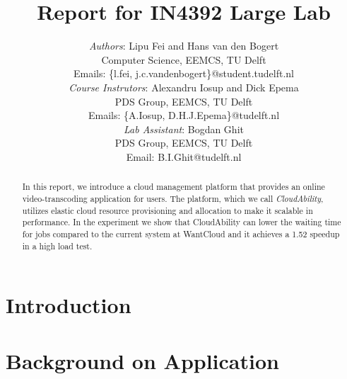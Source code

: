 \documentclass[10pt, a4paper, twoside, twocolumn, technote]{IEEEtran}
\begin{document}
\newcommand{\staterunning}
  {\textsc{running}}
\newcommand{\statepending}
  {\textsc{pending}}
  
\newcommand{\statefinished}
  {\textsc{finished}}
\newcommand{\statefailed}
  {\textsc{failed}}
  
\newcommand{\policystatic}
  {\textsc{static}}
\newcommand{\policysimpleelastic}
  {\textsc{simple elastic}}


\title{Report for IN4392 Large Lab}
\author{\textit{Authors}: Lipu Fei and Hans van den Bogert\\
  Computer Science, EEMCS, TU Delft\\
  Emails: \{l.fei, j.c.vandenbogert\}@student.tudelft.nl\\
  \textit{Course Instrutors}: Alexandru Iosup and Dick Epema\\
  PDS Group, EEMCS, TU Delft\\
  Emails: \{A.Iosup, D.H.J.Epema\}@tudelft.nl\\
  \textit{Lab Assistant}: Bogdan Ghit\\
  PDS Group, EEMCS, TU Delft\\
  Email: B.I.Ghit@tudelft.nl}

\maketitle

\begin{abstract}
  In this report, we introduce a cloud management platform that
  provides an online video-transcoding application for users. The
  platform, which we call \emph{CloudAbility}, utilizes elastic cloud
  resource provisioning and allocation to make it scalable in
  performance. In the experiment we show that CloudAbility can lower
  the waiting time for jobs compared to the current system at
  WantCloud and it achieves a 1.52 speedup in a high load test.
\end{abstract}

\section{Introduction}


\section{Background on Application}\label{background}

\end{document}
